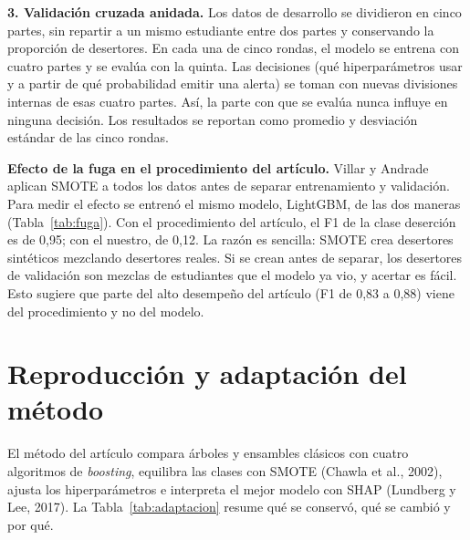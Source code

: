 \documentclass[11pt,a4paper]{article}
\begin{document}
\textbf{3. Validación cruzada anidada.} Los datos de desarrollo se dividieron en cinco partes, sin repartir a un mismo estudiante entre dos partes y conservando la proporción de desertores. En cada una de cinco rondas, el modelo se entrena con cuatro partes y se evalúa con la quinta. Las decisiones (qué hiperparámetros usar y a partir de qué probabilidad emitir una alerta) se toman con nuevas divisiones internas de esas cuatro partes. Así, la parte con que se evalúa nunca influye en ninguna decisión. Los resultados se reportan como promedio y desviación estándar de las cinco rondas.

\textbf{Efecto de la fuga en el procedimiento del artículo.} Villar y Andrade aplican SMOTE a todos los datos antes de separar entrenamiento y validación. Para medir el efecto se entrenó el mismo modelo, LightGBM, de las dos maneras (Tabla~\ref{tab:fuga}). Con el procedimiento del artículo, el F1 de la clase deserción es de 0,95; con el nuestro, de 0,12. La razón es sencilla: SMOTE crea desertores sintéticos mezclando desertores reales. Si se crean antes de separar, los desertores de validación son mezclas de estudiantes que el modelo ya vio, y acertar es fácil. Esto sugiere que parte del alto desempeño del artículo (F1 de 0,83 a 0,88) viene del procedimiento y no del modelo.

\begin{table}[H]
\centering
\small
\caption{Mismo modelo evaluado con los dos procedimientos (cinco rondas). El PR-AUC se explica en la Sección~4.}
\label{tab:fuga}

\end{table}

\section{Reproducción y adaptación del método}

El método del artículo compara árboles y ensambles clásicos con cuatro algoritmos de \textit{boosting}, equilibra las clases con SMOTE (Chawla et al., 2002), ajusta los hiperparámetros e interpreta el mejor modelo con SHAP (Lundberg y Lee, 2017). La Tabla~\ref{tab:adaptacion} resume qué se conservó, qué se cambió y por qué.
\end{document}
